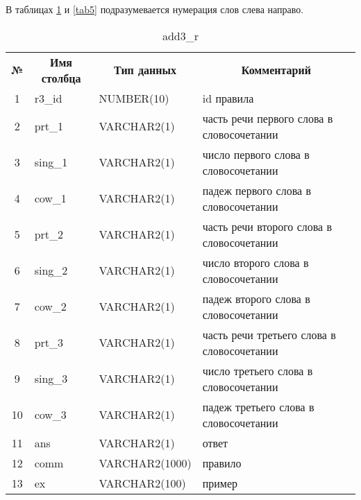 \documentclass[main]{subfiles}
\begin{document}
В таблицах \ref{tab4} и \ref{tab5} подразумевается нумерация слов слева направо.
\begin{longtable}[c]{|c|l|l|p{215px}|}
		\captionsetup{format=hang,labelsep = endash, singlelinecheck=false}
		\caption{add3\_r}\label{tab4}\\
			\hline
			\textbf{№} & \multicolumn{1}{c|}{\textbf{Имя столбца}} & \multicolumn{1}{c|}{\textbf{Тип данных}} & \multicolumn{1}{c|}{\textbf{Комментарий}} \\ \hline
			1&r3\_id &NUMBER(10) &id правила\\ \hline
			2& prt\_1 &VARCHAR2(1) & часть речи первого слова в словосочетании \\ \hline
			3& sing\_1 &VARCHAR2(1) & число первого слова в словосочетании \\ \hline
			4& cow\_1 &VARCHAR2(1) & падеж первого слова в словосочетании \\ \hline
			5& prt\_2 & VARCHAR2(1)& часть речи второго слова в словосочетании \\ \hline
			6& sing\_2 &VARCHAR2(1) & число второго слова в словосочетании \\ \hline
			7& cow\_2 &VARCHAR2(1) & падеж второго слова в словосочетании \\ \hline
			8& prt\_3 & VARCHAR2(1)& часть речи третьего слова в словосочетании \\ \hline
			9& sing\_3 &VARCHAR2(1) & число третьего слова в словосочетании \\ \hline
			10& cow\_3 &VARCHAR2(1) & падеж третьего слова в словосочетании \\ \hline
			11&ans&VARCHAR2(1)& ответ\\ \hline
			12&comm &VARCHAR2(1000)& правило\\ \hline
			13 &ex &VARCHAR2(100)&пример  \\ \hline
\end{longtable}
\end{document}
